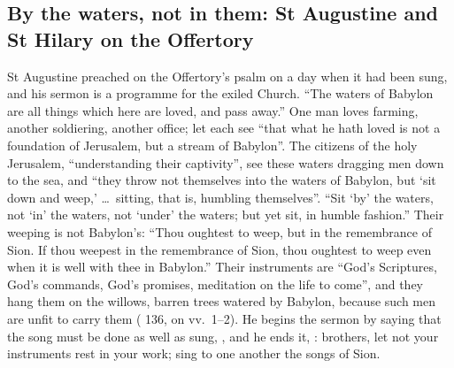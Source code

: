 \subsection{By the waters, not in them: St Augustine and St Hilary on the Offertory}

St Augustine preached on the Offertory's psalm on a day when it had been sung,
and his sermon is a programme for the exiled Church. ``The waters of Babylon are all
things which here are loved, and pass away.'' One man loves farming, another
soldiering, another office; let each see ``that what he hath loved is not a
foundation of Jerusalem, but a stream of Babylon''. The citizens of the holy
Jerusalem, ``understanding their captivity'', see these waters dragging men
down to the sea, and ``they throw not themselves into the waters of Babylon, but
`sit down and weep,' \dots\ sitting, that is, humbling themselves''. ``Sit `by'
the waters, not `in' the waters, not `under' the waters; but yet sit, in humble
fashion.'' Their weeping is not Babylon's: ``Thou oughtest to weep, but in the
remembrance of Sion. If thou weepest in the remembrance of Sion, thou oughtest
to weep even when it is well with thee in Babylon.'' Their instruments are
``God's Scriptures, God's commands, God's promises, meditation on the life to
come'', and they hang them on the willows, barren trees watered by Babylon,
because such men are unfit to carry them ( 136, on
vv.~1--2). He begins the sermon by saying that the song must be done as well as
sung, , and he
ends it, : brothers, let not your instruments rest in your work; sing to
one another the songs of Sion.

